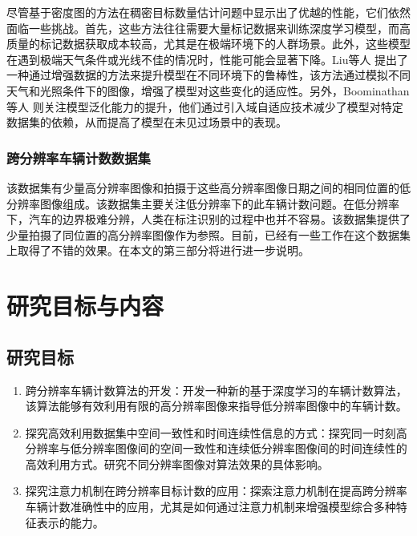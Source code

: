 尽管基于密度图的方法在稠密目标数量估计问题中显示出了优越的性能，它们依然面临一些挑战。首先，这些方法往往需要大量标记数据来训练深度学习模型，而高质量的标记数据获取成本较高，尤其是在极端环境下的人群场景。此外，这些模型在遇到极端天气条件或光线不佳的情况时，性能可能会显著下降。Liu等人\cite{2018CrowdCountingusingDeepRecurrentSpatialAwareNetwork} 提出了一种通过增强数据的方法来提升模型在不同环境下的鲁棒性，该方法通过模拟不同天气和光照条件下的图像，增强了模型对这些变化的适应性。另外，Boominathan 等人\cite{2016CrowdNetDeepConvolutionalNetworkDenseCrowdCounting} 则关注模型泛化能力的提升，他们通过引入域自适应技术减少了模型对特定数据集的依赖，从而提高了模型在未见过场景中的表现。

\subsubsection{跨分辨率车辆计数数据集}
该数据集\cite{2022VehicleCountingVeryLowResolutionAerialImagesCrossResolutionSpatialConsistencyIntraresolutionTimeContinuity}有少量高分辨率图像和拍摄于这些高分辨率图像日期之间的相同位置的低分辨率图像组成。该数据集主要关注低分辨率下的此车辆计数问题。在低分辨率下，汽车的边界极难分辨，人类在标注识别的过程中也并不容易。该数据集提供了少量拍摄了同位置的高分辨率图像作为参照。目前，已经有一些工作\cite{2022VehicleCountingVeryLowResolutionAerialImagesCrossResolutionSpatialConsistencyIntraresolutionTimeContinuity}\cite{2023Hightemporalfrequencyvehiclecountinglowresolutionsatelliteimages}在这个数据集上取得了不错的效果。在本文的第三部分将进行进一步说明。
\section{研究目标与内容}
\subsection{研究目标}
\begin{enumerate}    
    \item 跨分辨率车辆计数算法的开发：开发一种新的基于深度学习的车辆计数算法，该算法能够有效利用有限的高分辨率图像来指导低分辨率图像中的车辆计数。
    \item 探究高效利用数据集中空间一致性和时间连续性信息的方式：探究同一时刻高分辨率与低分辨率图像间的空间一致性和连续低分辨率图像间的时间连续性的高效利用方式。研究不同分辨率图像对算法效果的具体影响。
    \item 探究注意力机制在跨分辨率目标计数的应用：探索注意力机制在提高跨分辨率车辆计数准确性中的应用，尤其是如何通过注意力机制来增强模型综合多种特征表示的能力。
\end{enumerate}

